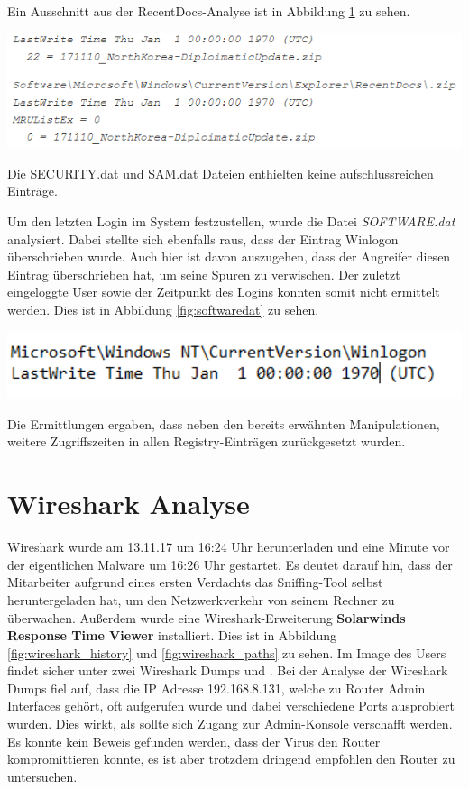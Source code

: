Ein Ausschnitt aus der RecentDocs-Analyse ist in Abbildung \ref{} zu sehen.
\begin{center}
	\includegraphics[width=15.8cm]{figures/prefetch_manipulation.png}
	\label{fig:prefetch_manipulation}
\end{center}

Die SECURITY.dat und SAM.dat Dateien enthielten keine aufschlussreichen Einträge.


Um den letzten Login im System festzustellen, wurde die Datei \textit{SOFTWARE.dat} analysiert. Dabei stellte sich ebenfalls raus, dass der Eintrag Winlogon überschrieben wurde. Auch hier ist davon auszugehen, dass der Angreifer diesen Eintrag überschrieben hat, um seine Spuren zu verwischen. Der zuletzt eingeloggte User sowie der Zeitpunkt des Logins konnten somit nicht ermittelt werden. Dies ist in Abbildung \ref{fig:softwaredat} zu sehen.

\begin{center}
	\includegraphics[width=15.8cm]{figures/softwaredat.png}
	\label{fig:softwaredat}
\end{center}

Die Ermittlungen ergaben, dass neben den bereits erwähnten Manipulationen, weitere Zugriffszeiten in allen Registry-Einträgen zurückgesetzt wurden.

\section{Wireshark Analyse}
Wireshark wurde am 13.11.17 um 16:24 Uhr herunterladen und eine Minute vor der eigentlichen Malware um 16:26 Uhr gestartet. Es deutet darauf hin, dass der Mitarbeiter aufgrund eines ersten Verdachts das Sniffing-Tool selbst heruntergeladen hat, um den Netzwerkverkehr von seinem Rechner zu überwachen. Außerdem wurde eine Wireshark-Erweiterung \textbf{Solarwinds Response Time Viewer} installiert. Dies ist in Abbildung \ref{fig:wireshark_history} und \ref{fig:wireshark_paths} zu sehen. Im Image des Users findet sicher unter  zwei Wireshark Dumps  und . Bei der Analyse der Wireshark Dumps fiel auf, dass die IP Adresse 192.168.8.131, welche zu Router Admin Interfaces gehört, oft aufgerufen wurde und dabei verschiedene Ports ausprobiert wurden. Dies wirkt, als sollte sich Zugang zur Admin-Konsole verschafft werden. Es konnte kein Beweis gefunden werden, dass der Virus den Router kompromittieren konnte, es ist aber trotzdem dringend empfohlen den Router zu untersuchen.

